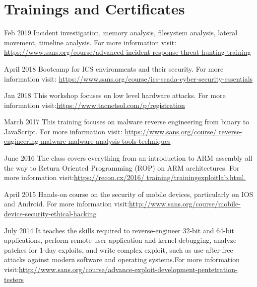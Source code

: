 
\section{Trainings and Certificates}

{Feb 2019}
{Incident investigation, memory analysis, filesystem analysis, lateral movement, timeline analysis. For more information visit: \newline \url{https://www.sans.org/course/advanced-incident-response-threat-hunting-training}}

{April 2018}
{Bootcamp for ICS environments and their security. For more information visit: \newline \url{https://www.sans.org/course/ics-scada-cyber-security-essentials}}

{Jan 2018}
{This workshop focuses on low level hardware attacks. For more information visit:\newline \url{https://www.tacnetsol.com/p/registration}}

{March 2017}
{This training focuses on malware reverse engineering from binary to JavaScript. For more information visit: \newline \url{https://www.sans.org/course/ reverse-engineering-malware-malware-analysis-tools-techniques}}

{June 2016}
{The class covers everything from an introduction to ARM assembly all the way to Return Oriented Programming (ROP) on ARM architectures. For more information visit:\newline \url{https://recon.cx/2016/ training/trainingexploitlab.html.}}

{April 2015}
{Hands-on course on the security of mobile devices, particularly on IOS and Android. For more information visit:\newline \url{http://www.sans.org/course/mobile-device-security-ethical-hacking}}

{July 2014}
{It teaches the skills required to reverse-engineer 32-bit and 64-bit applications, perform remote user application and kernel debugging, analyze patches for 1-day exploits, and write complex exploit, such as use-after-free attacks against modern software and operating systems.For more information visit:\newline \url{http://www.sans.org/course/advance-exploit-development-pentetration-testers}}

